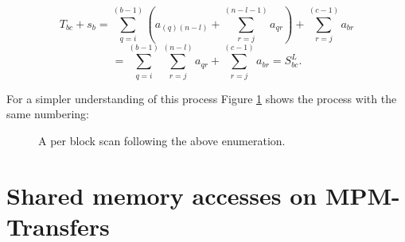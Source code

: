 \documentclass[m,times]{cgMA}
\begin{document}
\begin{appendices}
\begin{enumerate}
  $$T_{bc} + s_{b} = \sum_{q=i}^{(b-1)}\left(a_{(q)(n-l)} + \sum_{r=j}^{(n-l-1)} a_{qr}\right) + \sum_{r=j}^{(c-1)} a_{br}$$
  \begin{equation}
    = \sum_{q=i}^{(b-1)}\sum_{r=j}^{(n-l)} a_{qr} + \sum_{r=j}^{(c-1)} a_{br} = S^L_{bc}.
  \end{equation}
\end{enumerate}
For a simpler understanding of this process Figure \ref{fig:tile_scan} shows the process with the same numbering:
\begin{figure}[htbp]
  
  \caption{A per block scan following the above enumeration.}
  \label{fig:tile_scan}
\end{figure}

\clearpage
\section{Shared memory accesses on MPM-Transfers}\label{sec:shared_transfer}
\newcommand{\mc}[2]{\multicolumn{#1}{c}{#2}}


\end{appendices}
\end{document}
